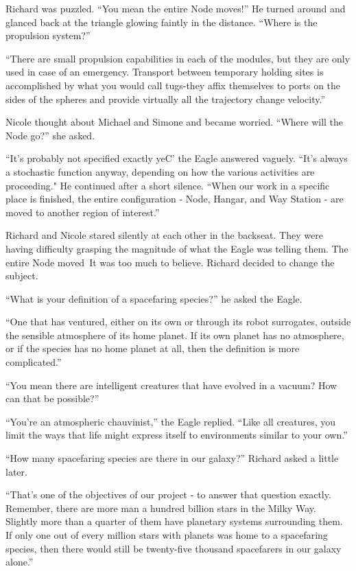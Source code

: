 \documentclass[]{article}
\begin{document}
{Richard was puzzled.  “You mean the entire Node moves!” He turned around and glanced back at the triangle glowing faintly in the distance.  “Where is the propulsion system?”

“There are small propulsion capabilities in each of the modules, but they are only used in case of an emergency.  Transport between temporary holding sites is accomplished by what you would call tugs-they affix themselves to ports on the sides of the spheres and provide virtually all the trajectory change velocity.”

Nicole thought about Michael and Simone and became worried.  “Where will the Node go?” she asked.

“It’s probably not specified exactly yeC’ the Eagle answered vaguely.  “It’s always a stochastic function anyway, depending on how the various activities are proceeding."  He continued after a short silence.  “When our work in a specific place is finished, the entire configuration - Node, Hangar, and Way Station - are moved to another region of interest.”

Richard and Nicole stared silently at each other in the backseat.  They were having difficulty grasping the magnitude of what the Eagle was telling them.  The entire Node moved\ It was too much to believe.  Richard decided to change the subject.

“What is your definition of a spacefaring species?” he asked the Eagle.

“One that has ventured, either on its own or through its robot surrogates, outside the sensible atmosphere of its home planet.  If its own planet has no atmosphere, or if the species has no home planet at all, then the definition is more complicated.”

“You mean there are intelligent creatures that have evolved in a vacuum? How can that be possible?”

“You’re an atmospheric chauvinist,” the Eagle replied.  “Like all creatures, you limit the ways that life might express itself to environments similar to your own.”

“How many spacefaring species are there in our galaxy?” Richard asked a little later.

“That’s one of the objectives of our project - to answer that question exactly.  Remember, there are more man a hundred billion stars in the Milky Way.  Slightly more than a quarter of them have planetary systems surrounding them.  If only one out of every million stars with planets was home to a spacefaring species, then there would still be twenty-five thousand spacefarers in our galaxy alone.”

}
\end{document}

